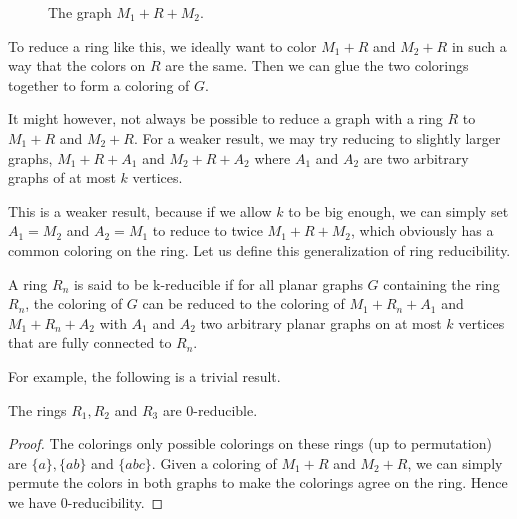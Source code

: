 \begin{figure}[!ht]
    \centering
    \caption{The graph $M_1 + R + M_2$.}
\end{figure}

To reduce a ring like this, we ideally want to color $M_1+R$ and $M_2+R$ in such a way that the colors on $R$ are the same. Then we can glue the two colorings together to form a coloring of $G$.

It might however, not always be possible to reduce a graph with a ring $R$ to $M_1+R$ and $M_2+R$. For a weaker result, we may try reducing to slightly larger graphs, $M_1+R+A_1$ and $M_2+R+A_2$ where $A_1$ and $A_2$ are two arbitrary graphs of at most $k$ vertices. 

This is a weaker result, because if we allow $k$ to be big enough, we can simply set $A_1 = M_2$ and $A_2 = M_1$ to reduce to twice $M_1 + R + M_2$, which obviously has a common coloring on the ring. Let us define this generalization of ring reducibility.

\begin{definition}
    A ring $R_n$ is said to be k-reducible if for all planar graphs $G$ containing the ring $R_n$, the coloring of $G$ can be reduced to the coloring of $M_1+R_n+A_1$ and $M_1+R_n+A_2$ with $A_1$ and $A_2$ two arbitrary planar graphs on at most $k$ vertices that are fully connected to $R_n$.
\end{definition}

For example, the following is a trivial result.

\begin{example}
    The rings $R_1, R_2$ and $R_3$ are 0-reducible.
\end{example}

\begin{proof}
    The colorings only possible colorings on these rings (up to permutation) are $\{ a \}, \{ ab \}$ and $\{ abc \}$. Given a coloring of $M_1+R$ and $M_2+R$, we can simply permute the colors in both graphs to make the colorings agree on the ring. Hence we have 0-reducibility.
\end{proof}

